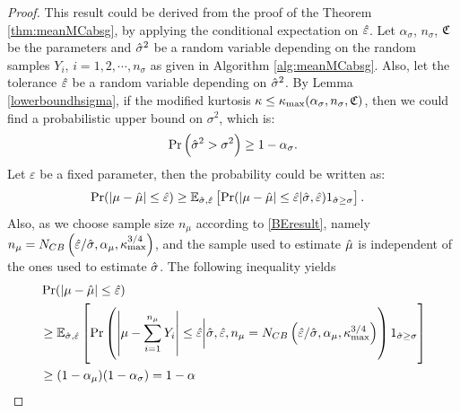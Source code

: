 \documentclass{iitthesis}
\begin{document}
\begin{proof}
This result could be derived from the proof of the Theorem \ref{thm:meanMCabsg}, by applying the conditional expectation on $\hat{\varepsilon}$.
Let $\alpha_\sigma$, $n_\sigma$, $\mathfrak{C}$ be the parameters and $\hat{\sigma}^2$ be a random variable depending on the random samples $Y_i$, $i = 1,2,\cdots, n_{\sigma}$ as given in Algorithm \ref{alg:meanMCabsg}. Also, let the tolerance $\hat{\varepsilon}$ be a random variable depending on $\hat{\sigma}^2$. By Lemma \ref{lowerboundhsigma}, if the modified kurtosis $\kappa \leq \kappa_{\max}(\alpha_{\sigma},n_{\sigma},\mathfrak{C})$, then we could find a probabilistic upper bound on $\sigma^2$, which is:
$$\Pr \left(\hat{\sigma}^2 > \sigma^2\right)\geq 1-\alpha_{\sigma}.$$
Let $\varepsilon$ be a fixed parameter, then the probability could be written as:
\begin{align}
&\Pr(\left \lvert \mu-\hat{\mu} \right \rvert \leq \hat{\varepsilon}) \geq \mathbb{E}_{\hat{\sigma},\hat{\varepsilon}}\left[\Pr({\left \lvert \mu-\hat{\mu} \right \rvert \leq \hat{\varepsilon}}| \hat{\sigma} , \hat{\varepsilon})1_{\hat{\sigma} \geq \sigma }\right].
\end{align}
Also, as we choose sample size $n_\mu$ according to \eqref{BEresult}, namely $n_\mu= N_{CB}\left(\hat{\varepsilon}/\hat{\sigma},\alpha_\mu, \kappa_{\max}^{3/4}\right)$, and the sample used to estimate $\hat{\mu}$ is independent of the ones used to estimate $\hat{\sigma}$.  The following inequality yields
\begin{align}
&\Pr(\left \lvert \mu-\hat{\mu} \right \rvert \leq \hat{\varepsilon})\\
&\geq \mathbb{E}_{\hat{\sigma},\hat{\varepsilon}}\left[\Pr\left({\left \lvert \mu-\sum_{i=1}^{n_\mu}Y_i \right \rvert \leq \hat{\varepsilon}}\bigg \vert \hat{\sigma} , \hat{\varepsilon}, n_\mu= N_{CB}\left(\hat{\varepsilon}/\hat{\sigma},\alpha_\mu, \kappa_{\max}^{3/4}\right)\right)1_{\hat{\sigma} \geq \sigma }\right]\\
&\geq (1-\alpha_\mu)(1-\alpha_\sigma) = 1-\alpha
\end{align}


\end{proof}
\end{document}
